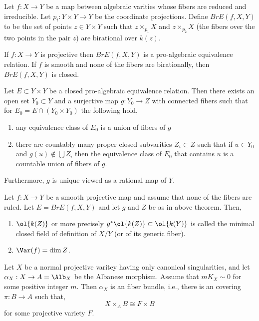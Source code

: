 \documentclass[12pt]{article}
\begin{document}
\begin{defn}
Let $f : X \to Y$ be a map between algebraic varities whose fibers are reduced and irreducible. Let $p_i : Y \times Y \to Y$ be the coordinate projections. Define $Br E(f, X, Y)$ to be the set of points $z \in Y \times Y$ such that $z \times_{p_1} X$ and $z \times_{p_2} X$ (the fibers over the two points in the pair $z$) are birational over $k(z)$.
\end{defn}

\begin{prop}
If $f : X \to Y$ is projective then $Br E(f, X, Y)$ is a pro-algebraic equivalence relation. If $f$ is smooth and none of the fibers are birationally, then $Br E(f, X, Y)$ is closed. 
\end{prop}

\begin{theorem}
Let $E \subset Y \times Y$ be a closed pro-algebraic equivalence relation. Then there exists an open set $Y_0 \subset Y$ and a surjective map $g : Y_0 \to Z$ with connected fibers such that for $E_0 = E \cap (Y_0 \times Y_0)$ the following hold,
\begin{enumerate}
\item any equivalence class of $E_0$ is a union of fibers of $g$
\item there are countably many proper closed subvarities $Z_i \subset Z$
such that if $u \in Y_0$ and $g(u) \notin \bigcup Z_i$ then the equivalence class of $E_0$ that contains $u$ is a countable union of fibers of $g$.
\end{enumerate}
Furthermore, $g$ is unique viewed as a rational map of $Y$. 
\end{theorem}

\begin{prop}
Let $f : X \to Y$ be a smooth projective map and assume that none of the fibers are ruled. Let $E = Br E(f, X,Y)$ and let $g$ and $Z$ be as in above theorem. Then,
\begin{enumerate}
\item $\ol{k(Z)}$ or more precisely $g^* \ol{k(Z)} \subset \ol{k(Y)}$ is called the minimal closed field of definition of $X/Y$ (or of its generic fiber).
\item $\Var(f) = \dim{Z}$. 
\end{enumerate}
\end{prop}

\begin{prop}
Let $X$ be a normal projective varitey having only canonical singularities, and let $\alpha_X : X \to A = \Alb_X$ be the Albanese morphism. Assume that $m K_X \sim 0$ for some positive integer $m$. Then $\alpha_X$ is an \etale fiber bundle, i.e., there is an \etale covering $\pi : B \to A$ such that,
\[ X \times_A B \cong F \times B \]
for some projective variety $F$.
\end{prop}
\end{document}
